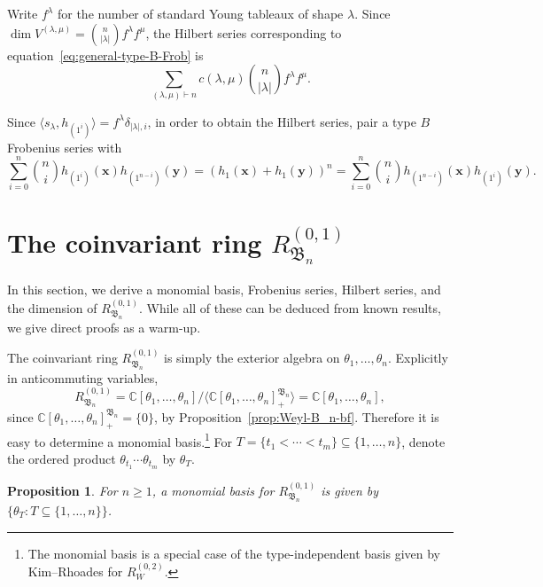 \documentclass[12pt]{amsart}
\theoremstyle{plain}
\newtheorem{proposition}[theorem]{Proposition}
\theoremstyle{definition}
\newcommand{\C}{\mathbb{C}}
\newcommand{\x}{\mathbf{x}}
\newcommand{\y}{\mathbf{y}}
\begin{document}
Write $f^\lambda$ for the number of standard Young tableaux of shape $\lambda$.
Since $\dim V^{(\lambda,\mu)} = \binom{n}{|\lambda|} f^\lambda f^\mu$, the Hilbert series corresponding to equation~\eqref{eq:general-type-B-Frob} is
\begin{equation}
    \sum_{(\lambda,\mu) \vdash n} c(\lambda,\mu) \binom{n}{|\lambda|} f^\lambda f^\mu.
\end{equation}

Since $\langle s_\lambda , h_{(1^i)} \rangle = f^\lambda \delta_{|\lambda|,i}$, in order to obtain the Hilbert series, pair a type $B$ Frobenius series with
\begin{equation}\label{eq:to-pair}
    \sum_{i=0}^n \binom{n}{i} h_{(1^i)}(\x)  h_{(1^{n-i})}(\y) = \left(h_1(\x) + h_1(\y) \right)^n = \sum_{i=0}^n \binom{n}{i} h_{(1^{n-i})}(\x)  h_{(1^{i})}(\y).
\end{equation}


\section{The coinvariant ring \texorpdfstring{$R_{\mathfrak{B}_n}^{(0,1)}$}{RBn(0,1)}}\label{sec:01}

In this section, we derive a monomial basis, Frobenius series, Hilbert series, and the dimension of $R_{\mathfrak{B}_n}^{(0,1)}$.
While all of these can be deduced from known results, we give direct proofs as a warm-up.

The coinvariant ring $R_{\mathfrak{B}_n}^{(0,1)}$ is simply the exterior algebra on $\theta_1,\ldots,\theta_n$.
Explicitly in anticommuting variables,
\begin{equation}
    R_{\mathfrak{B}_n}^{(0,1)} = \C[\theta_1,\ldots,\theta_n]/{\langle\C[\theta_1,\ldots,\theta_n]_+^{\mathfrak{B}_n}\rangle} = \C[\theta_1,\ldots,\theta_n],
\end{equation}
since $\C[\theta_1,\ldots,\theta_n]_+^{\mathfrak{B}_n} = \{0\}$, by Proposition~\ref{prop:Weyl-B_n-bf}.
Therefore it is easy to determine a monomial basis.\footnote{The monomial basis is a special case of the type-independent basis given by Kim--Rhoades \cite{MR4381935} for $R_{W}^{(0,2)}$.} 
For $T = \{t_1 <\cdots <t_m\} \subseteq \{1,\ldots,n\}$, denote the ordered product $\theta_{t_1} \cdots \theta_{t_m}$ by $\theta_T$.

\begin{proposition}
    For $n \geq 1$, a monomial basis for $R_{\mathfrak{B}_n}^{(0,1)}$ is given by $\{\theta_T : T \subseteq \{1,\ldots,n\} \}$. 
\end{proposition}
\end{document}
